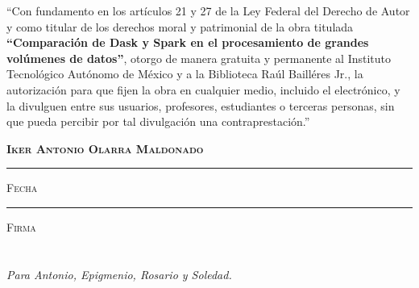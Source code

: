 \documentclass[11pt, oneside]{book}
\begin{document}

\thispagestyle{empty}

\vspace*{\fill}
\begingroup

\noindent
``Con fundamento en los artículos 21 y 27 de la Ley Federal del Derecho de Autor y como titular de los derechos moral y patrimonial de la obra titulada \textbf{``Comparación de Dask y Spark en el procesamiento de grandes volúmenes de datos''}, otorgo de manera gratuita y permanente al Instituto Tecnológico Autónomo de México y a la Biblioteca Raúl Bailléres Jr., la autorización para que fijen la obra en cualquier medio, incluido el electrónico, y la divulguen entre sus usuarios, profesores, estudiantes o terceras personas, sin que pueda percibir por tal divulgación una contraprestación.''


\centering 

\vspace{3em}

\textsc{\textbf{Iker Antonio Olarra Maldonado}}

\vspace{5em}

\rule[1em]{20em}{0.5pt} %

\textsc{Fecha}
 
\vspace{5em}

\rule[1em]{20em}{0.5pt} %

\textsc{Firma}

\endgroup
\vspace*{\fill}


\pagestyle{plain}
\frontmatter

\chapter*{}
\begin{flushright}
\textit{Para Antonio, Epigmenio, Rosario y Soledad.}
\end{flushright}
\end{document}
